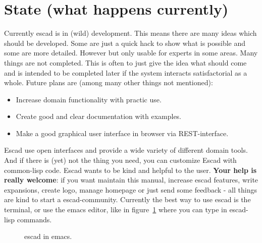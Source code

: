 \documentclass[a4paper, 12pt, openany]{scrbook}
\begin{document}
\section{State (what happens currently)}
Currently escad is in (wild) development. This means there are many ideas which should be developed. Some are just a quick hack to show what is possible and some are more detailed. However but only usable for experts in some areas. Many things are not completed. This is often to just give the idea what should come and is intended to be completed later if the system interacts satisfactorial as a whole.
Future plans are (among many other things not mentioned):
\begin{itemize}
\item Increase domain functionality with practic use.
\item Create good and clear documentation with examples.
\item Make a good graphical user interface in browser via REST-interface.
\end{itemize}
Escad use open interfaces and provide a wide variety of different domain tools. And if there is (yet) not the thing you need, you can customize Escad with common-lisp code. Escad wants to be kind and helpful to the user. \textbf{Your help is really welcome}: if you want maintain this manual, increase escad features, write expansions, create logo, manage homepage or just send some feedback - all things are kind to start a escad-community. Currently the best way to use escad is the terminal, or use the emacs editor, like in figure~\ref{fig:escad_emacs} where you can type in escad-lisp commands.
\begin{figure}[htbp]
  \centering
  \caption{escad in emacs.}
  \label{fig:escad_emacs}
\end{figure}
\end{document}
